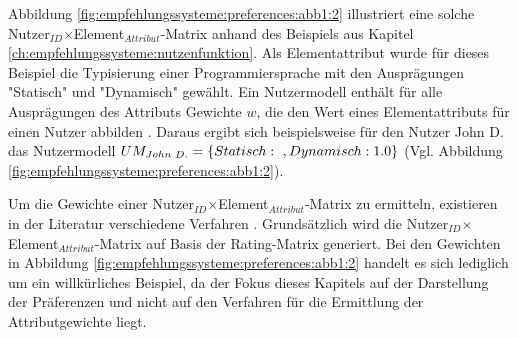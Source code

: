 Abbildung \ref{fig:empfehlungssysteme:preferences:abb1:2} illustriert eine solche Nutzer$_{ID}$$\times$Element$_{Attribut}$-Matrix anhand des Beispiels aus Kapitel \ref{ch:empfehlungssysteme:nutzenfunktion}.
Als Elementattribut wurde für dieses Beispiel die Typisierung einer Programmiersprache mit den Ausprägungen "Statisch" und "Dynamisch" gewählt.
Ein Nutzermodell enthält für alle Ausprägungen des Attributs Gewichte $w$, die den Wert eines Elementattributs für einen Nutzer abbilden \cite[S. 251]{berkovsky:article}.
Daraus ergibt sich beispielsweise für den Nutzer John D. das Nutzermodell $UM_{John\textnormal{ }D.} = \{Statisch:\textnormal{ }, Dynamisch: 1.0\}$ (Vgl. Abbildung \ref{fig:empfehlungssysteme:preferences:abb1:2}).

Um die Gewichte einer Nutzer$_{ID}$$\times$Element$_{Attribut}$-Matrix zu ermitteln, existieren in der Literatur verschiedene Verfahren \cite[S. 42]{berkovsky:2:article}.
Grundsätzlich wird die Nutzer$_{ID}$$\times$Element$_{Attribut}$-Matrix auf Basis der Rating-Matrix generiert.
Bei den Gewichten in Abbildung \ref{fig:empfehlungssysteme:preferences:abb1:2} handelt es sich lediglich um ein willkürliches Beispiel, da der Fokus dieses Kapitels auf der Darstellung der Präferenzen und nicht auf den Verfahren für die Ermittlung der Attributgewichte liegt.


